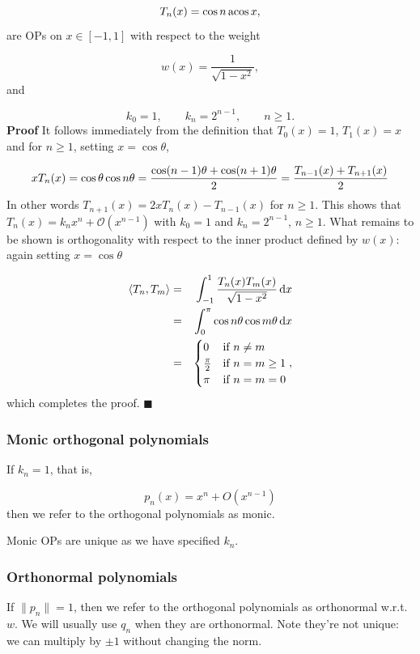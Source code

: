 \documentclass[12pt,a4paper]{article}
\begin{document}
\[
T_n(x) = \cos n\,{\rm acos}\, x,
\]
are OPs on $x \in [-1, 1]$ with respect to the weight

\[
w(x) = \frac{1}{\sqrt{1 - x^2}},
\]
and

\[
k_0 = 1, \qquad k_n = 2^{n-1}, \qquad n \geq 1.
\]
\textbf{Proof}  It follows immediately from the definition that $T_0(x) = 1$, $T_{1}(x) = x$ and for $n \geq 1$, setting $x = \cos \theta$,

\[
x T_n(x) = \cos \ensuremath{\theta} \cos n \ensuremath{\theta} = {\cos(n-1)\ensuremath{\theta} + \cos(n+1)\ensuremath{\theta} \over 2} = {T_{n-1}(x) + T_{n+1}(x) \over 2}
\]
In other words $T_{n+1}(x) = 2x T_n(x) - T_{n-1}(x)$ for $n \geq 1$. This shows that $T_n(x) = k_nx^{n} + \mathcal{O}(x^{n-1})$ with $k_0 = 1$ and $k_n = 2^{n-1}$, $n \geq 1$.  What remains to be shown is orthogonality with respect to the inner product defined by $w(x)$: again setting $x = \cos \theta$


\begin{eqnarray*}
\langle T_n, T_m\rangle &=& \int_{-1}^{1}\frac{T_n(x)T_m(x)}{\sqrt{1 - x^2}}\, {\rm d}x \\
  &= & \int_{0}^{\pi} \cos n\theta \cos m\theta \, {\rm d}x \\
  &=& \begin{cases} 
0 & \text{if } n \neq m \\
\frac{\pi}{2} & \text{if } n = m \geq 1 \\
\pi & \text{if } n = m = 0
\end{cases},
\end{eqnarray*}
which completes the proof.  $\blacksquare$

\subsubsection{Monic orthogonal polynomials}
If $k_n = 1$, that is,

\[
p_n(x) = x^n + O(x^{n-1})
\]
then we refer to the orthogonal polynomials as monic.

Monic OPs are unique as we have specified $k_n$.

\subsubsection{Orthonormal polynomials}
If  $\| p_n \| = 1$, then we refer to the orthogonal polynomials as orthonormal w.r.t. $w$. We will usually use $q_n$ when they are orthonormal.   Note they're not unique: we can multiply by $\pm 1$ without changing the norm.
\end{document}
